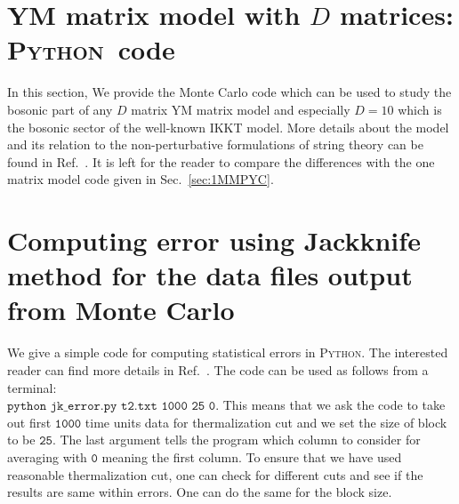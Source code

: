 \documentclass[11pt]{article}
\newcommand{\PY}{\textsc{Python}}
\begin{document}
\begin{footnotesize} 
\begin{mdframed}[backgroundcolor=mauve!3] 

\end{mdframed} 
\end{footnotesize} 

\vspace{10mm}
 
\section{\label{sec:YMC}YM matrix model with $D$ matrices: \PY~code}

In this section, We provide the Monte Carlo code which can be used to study the bosonic part of any $D$ matrix YM matrix model and especially $D=10$ which is the bosonic sector of the well-known IKKT model. More details about the model and its relation to the non-perturbative formulations of string theory can be found in Ref.~\cite{Hotta:1998en}.
It is left for the reader to compare the differences with the one matrix model code given in Sec.~\ref{sec:1MMPYC}. 

\begin{footnotesize} 
	\begin{mdframed}[backgroundcolor=mauve!3] 
			
	\end{mdframed} 
\end{footnotesize}


\section{Computing error using Jackknife method for the data files output from Monte Carlo}

We give a simple code for computing statistical errors in \PY. The interested reader can find more details in Ref.~\cite{2012arXiv1210.3781Y}. The code can be used as follows from a terminal: \\ 
$\texttt{python jk\_error.py t2.txt 1000 25 0}$. This means that we ask the code to take out first $\texttt{1000}$ time units data for thermalization cut and we set the size of block to be $\texttt{25}$. The last argument tells the program which column to consider for averaging with $\texttt{0}$ meaning the first column. To ensure that we have used reasonable thermalization cut, one can check for different cuts and see if the results 
are same within errors. One can do the same for the block size. 
\end{document}
